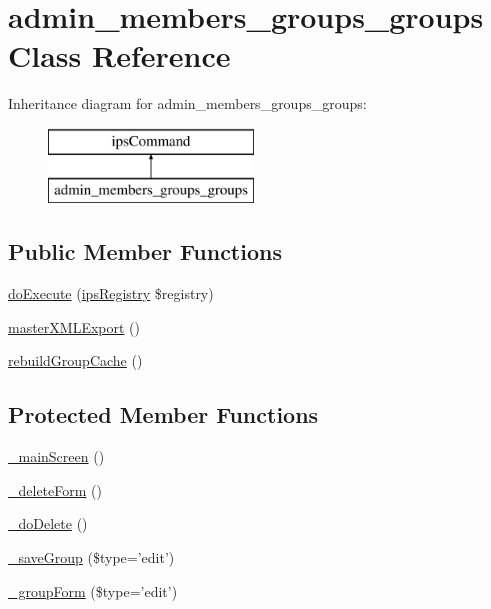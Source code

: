 \hypertarget{classadmin__members__groups__groups}{\section{admin\-\_\-members\-\_\-groups\-\_\-groups Class Reference}
\label{classadmin__members__groups__groups}
}
Inheritance diagram for admin\-\_\-members\-\_\-groups\-\_\-groups\-:\begin{figure}[H]
\begin{center}
\leavevmode
\includegraphics[height=2.000000cm]{classadmin__members__groups__groups}
\end{center}
\end{figure}
\subsection*{Public Member Functions}
\begin{DoxyCompactItemize}
\item 
\hyperlink{classadmin__members__groups__groups_afbc4e912a0604b94d47d66744c64d8ba}{do\-Execute} (\hyperlink{classips_registry}{ips\-Registry} \$registry)
\item 
\hyperlink{classadmin__members__groups__groups_aeea1ffaca9d8d2b7798cd0877b7045a5}{master\-X\-M\-L\-Export} ()
\item 
\hyperlink{classadmin__members__groups__groups_a1d804d9ec5aaf36b0b7500c7f224a17e}{rebuild\-Group\-Cache} ()
\end{DoxyCompactItemize}
\subsection*{Protected Member Functions}
\begin{DoxyCompactItemize}
\item 
\hyperlink{classadmin__members__groups__groups_af0d4b2cda2063751a0d768db8f78a38e}{\-\_\-main\-Screen} ()
\item 
\hyperlink{classadmin__members__groups__groups_a0179865658ce56792937103bb601a5da}{\-\_\-delete\-Form} ()
\item 
\hyperlink{classadmin__members__groups__groups_a706bbcf35b4965482866a0fb2f370d53}{\-\_\-do\-Delete} ()
\item 
\hyperlink{classadmin__members__groups__groups_a36667358d7e50338c7c1a858d87d249d}{\-\_\-save\-Group} (\$type='edit')
\item 
\hyperlink{classadmin__members__groups__groups_ab4bc5929dee17cb3d514e8865d78c434}{\-\_\-group\-Form} (\$type='edit')
\end{DoxyCompactItemize}
